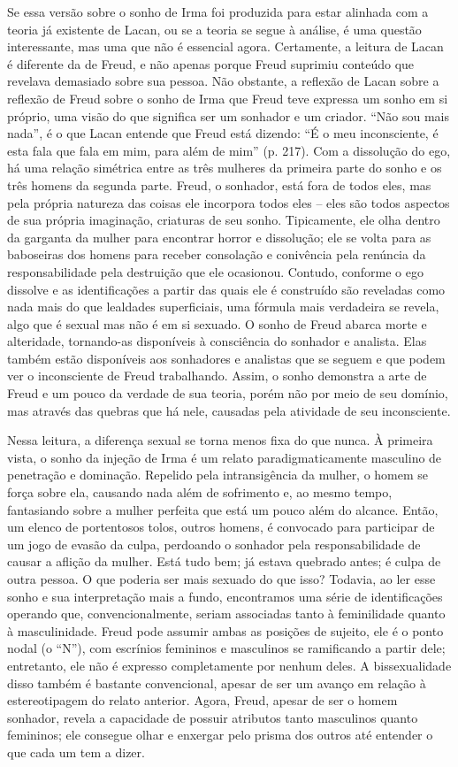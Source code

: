 Se essa versão sobre o sonho de Irma foi produzida para estar alinhada
com a teoria já existente de Lacan, ou se a teoria se segue à análise, é
uma questão interessante, mas uma que não é essencial agora. Certamente,
a leitura de Lacan é diferente da de Freud, e não apenas porque Freud
suprimiu conteúdo que revelava demasiado sobre sua pessoa. Não obstante,
a reflexão de Lacan sobre a reflexão de Freud sobre o sonho de Irma que
Freud teve expressa um sonho em si próprio, uma visão do que significa
ser um sonhador e um criador. ``Não sou mais nada'', é o que Lacan
entende que Freud está dizendo: ``É o meu inconsciente, é esta fala que
fala em mim, para além de mim'' (p. 217). Com a dissolução do ego, há
uma relação simétrica entre as três mulheres da primeira parte do sonho
e os três homens da segunda parte. Freud, o sonhador, está fora de todos
eles, mas pela própria natureza das coisas ele incorpora todos eles --
eles são todos aspectos de sua própria imaginação, criaturas de seu
sonho. Tipicamente, ele olha dentro da garganta da mulher para encontrar
horror e dissolução; ele se volta para as baboseiras dos homens para
receber consolação e conivência pela renúncia da responsabilidade pela
destruição que ele ocasionou. Contudo, conforme o ego dissolve e as
identificações a partir das quais ele é construído são reveladas como
nada mais do que lealdades superficiais, uma fórmula mais verdadeira se
revela, algo que é sexual mas não é em si sexuado. O sonho de Freud
abarca morte e alteridade, tornando-as disponíveis à consciência do
sonhador e analista. Elas também estão disponíveis aos sonhadores e
analistas que se seguem e que podem ver o inconsciente de Freud
trabalhando. Assim, o sonho demonstra a arte de Freud e um pouco da
verdade de sua teoria, porém não por meio de seu domínio, mas através
das quebras que há nele, causadas pela atividade de seu inconsciente.

Nessa leitura, a diferença sexual se torna menos fixa do que nunca. À
primeira vista, o sonho da injeção de Irma é um relato
paradigmaticamente masculino de penetração e dominação. Repelido pela
intransigência da mulher, o homem se força sobre ela, causando nada além
de sofrimento e, ao mesmo tempo, fantasiando sobre a mulher perfeita que
está um pouco além do alcance. Então, um elenco de portentosos tolos,
outros homens, é convocado para participar de um jogo de evasão da
culpa, perdoando o sonhador pela responsabilidade de causar a aflição da
mulher. Está tudo bem; já estava quebrado antes; é culpa de outra
pessoa. O que poderia ser mais sexuado do que isso? Todavia, ao ler esse
sonho e sua interpretação mais a fundo, encontramos uma série de
identificações operando que, convencionalmente, seriam associadas tanto
à feminilidade quanto à masculinidade. Freud pode assumir ambas as
posições de sujeito, ele é o ponto nodal (o ``N''), com escrínios
femininos e masculinos se ramificando a partir dele; entretanto, ele não
é expresso completamente por nenhum deles. A bissexualidade disso também
é bastante convencional, apesar de ser um avanço em relação à
estereotipagem do relato anterior. Agora, Freud, apesar de ser o homem
sonhador, revela a capacidade de possuir atributos tanto masculinos
quanto femininos; ele consegue olhar e enxergar pelo prisma dos outros
até entender o que cada um tem a dizer.

